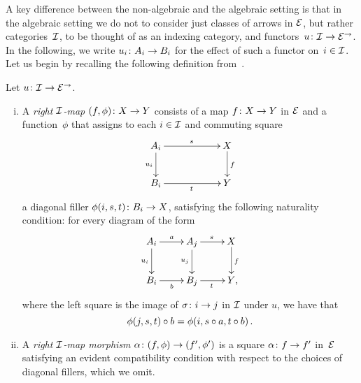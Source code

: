 \documentclass[reqno,10pt,a4paper,oneside,draft]{amsart}
\begin{document}
{{A key difference between the non-algebraic and the algebraic setting is that in the algebraic setting we do not to consider just classes of arrows in $\catE$, but rather categories~$\cal{I}$, to be thought of as an indexing category, and functors~$u \co \cal{I} \to \catE^\to$. In the following, we write $u_i \co A_i \to B_i$ for the effect of such a functor on~$i \in \cal{I}$.  Let us begin by recalling the following definition from~\cite{garner:small-object-argument}.

\begin{definition} \label{def:right-map}
Let $u \co \cal{I} \to \catE^\to$.
\begin{enumerate}[(i)]
\item A \emph{right $\cal{I}$-map} $(f, \phi) \co X \to Y$ consists of a map $f \co X \to Y$ in $\catE$ and a function~$\phi$ that assigns to each $i \in \cal{I}$ and commuting square
\[
\xymatrix@C=2cm{
  A_i
  \ar[r]^{s}
  \ar[d]_{u_i}
&
  X
  \ar[d]^f
\\
  B_i
  \ar[r]_{t}
&
  Y
}
\]
a diagonal filler $\phi(i,s, t) \co B_i \to X$, satisfying the following naturality condition: for every diagram of the form
\[
\xymatrix{
  A_i
  \ar[r]^{a}
  \ar[d]_{u_i}
&
  A_j
  \ar[r]^{s}
  \ar[d]_{u_j}
&
  X
  \ar[d]^f
\\
  B_i
  \ar[r]_{b}
&
  B_j
  \ar[r]_{t}
&
  Y
\rlap{,}}
\]
where the left square is the image of $\sigma \co i \to j$ in $\cal{I}$ under $u$, we have that
\[
  \phi(j, s, t) \cc b = \phi(i, s \cc a, t \cc b) \, .
\]
\item A \emph{right $\cal{I}$-map morphism} $\alpha \co (f, \phi) \to (f', \phi')$ is a square $\alpha \co f \to f'$ in~$\catE$ satisfying an evident compatibility condition with respect to the choices of diagonal fillers, which we omit.
\end{enumerate}
\end{definition}

}}
\end{document}
